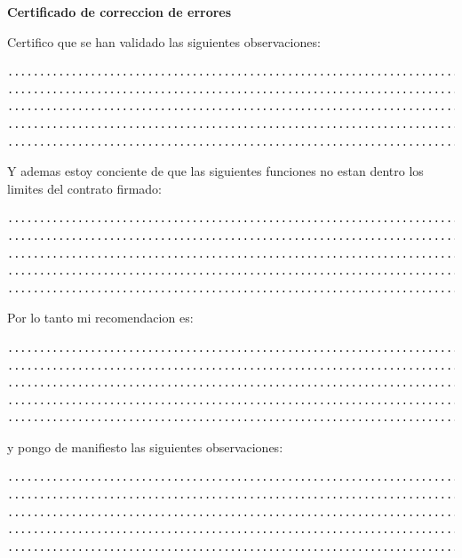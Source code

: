 \documentclass[letterpaper,spanish]{report}
\begin{document}
\begin{center}
    {\bfseries \large{Certificado de correccion de errores}}
\end{center}

\vspace{0.5cm}

Certifico que se han validado las siguientes observaciones:
\begin{verbatim}
.........................................................................................
.........................................................................................
.........................................................................................
.........................................................................................
.........................................................................................
\end{verbatim}

Y ademas estoy conciente de que las siguientes funciones no estan dentro los limites del contrato firmado:
\begin{verbatim}
.........................................................................................
.........................................................................................
.........................................................................................
.........................................................................................
.........................................................................................
\end{verbatim}

Por lo tanto mi recomendacion es:
\begin{verbatim}
.........................................................................................
.........................................................................................
.........................................................................................
.........................................................................................
.........................................................................................
\end{verbatim}

y pongo de manifiesto las siguientes observaciones:
\begin{verbatim}
.........................................................................................
.........................................................................................
.........................................................................................
.........................................................................................
.........................................................................................
\end{verbatim}
\end{document}
